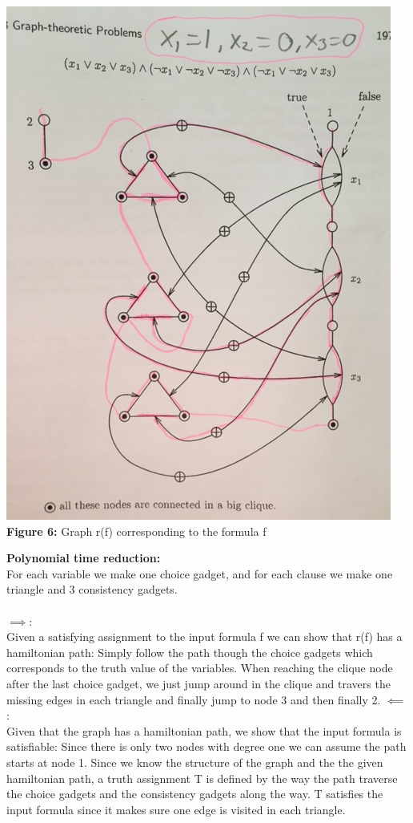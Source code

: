 \begin{center}
\includegraphics[scale=0.5, angle =-90]{3SATtoHAM}\\
\textbf{Figure 6:} Graph r(f) corresponding to the formula f
\end{center}
\textbf{Polynomial time reduction:}\\
For each variable we make one choice gadget, and for each clause we make one triangle and 3 consistency gadgets.\\\\
$\implies$: \\
Given a satisfying assignment to the input formula f we can show that r(f) has a hamiltonian path: Simply follow the path though the choice gadgets which corresponds to the truth value of the variables. When reaching the clique node after the last choice gadget, we just jump around in the clique and travers the missing edges in each triangle and finally jump to node 3 and then finally 2. 
$\impliedby$: \\
Given that the graph has a hamiltonian path, we show that the input formula is satisfiable: Since there is only two nodes with degree one we can assume the path starts at node 1. Since we know the structure of the graph and the the given hamiltonian path, a truth assignment T is defined by the way the path traverse the choice gadgets and the consistency gadgets along the way. T satisfies the input formula since it makes sure one edge is visited in each triangle. 
\newpage
